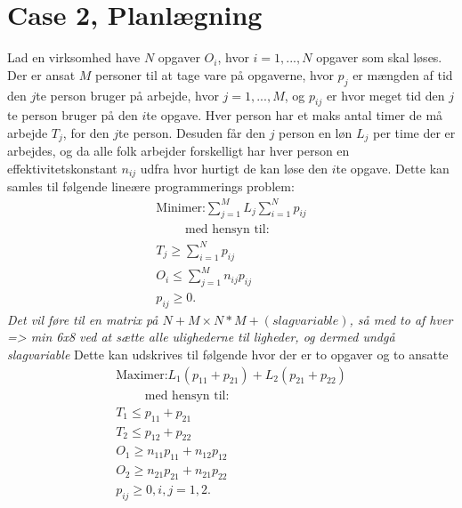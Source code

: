 \section{Case 2, Planlægning}
Lad en virksomhed have $N$ opgaver $O_i$, hvor $i=1,...,N$ opgaver som skal løses. 
Der er ansat $M$ personer til at tage vare på opgaverne, hvor $p_j$ er mængden af tid den $j$te person bruger på arbejde, hvor $j=1,...,M$, og $p_{ij}$ er hvor meget tid den $j$te person bruger på den $i$te opgave. 
Hver person har et maks antal timer de må arbejde $T_j$, for den $j$te person.
Desuden får den $j$ person en løn $L_j$ per time der er arbejdes, og da alle folk arbejder forskelligt har hver person en effektivitetskonstant $n_{ij}$ udfra hvor hurtigt de kan løse den $i$te opgave. 
Dette kan samles til følgende lineære programmerings problem:
\begin{align*}
\text{Minimer:}  \sum_{j=1}^M L_j \sum_{i=1}^N p_{ij}
\\\qquad \text{ med hensyn til:}
\\ T_j \geq \sum_{i=1}^N p_{ij}
\\ O_{i} \leq  \sum_{j=1}^M n_{ij} p_{ij}
\\ p_{ij} \geq 0.
\end{align*}
\textit{Det vil føre til en matrix på $N+M \times N*M+(slag variable)$, så med to af hver => min 6x8 ved at sætte alle ulighederne til ligheder, og dermed undgå slagvariable}
Dette kan udskrives til følgende hvor der er to opgaver og to ansatte
\begin{align*}
\text{Maximer:}  
L_{1} ( p_{11} +  p_{21}) + L_{2} ( p_{21} +  p_{22}) 
\\\qquad \text{ med hensyn til:}
\\T_1 \leq p_{11} + p_{21} 
\\ T_2 \leq  p_{12} + p_{22}
\\ O_{1} \geq n_{11} p_{11} + n_{12} p_{12}
\\ O_{2} \geq n_{21} p_{21} + n_{21} p_{22}
\\ p_{ij} \geq 0, i,j = 1, 2.
\end{align*}






















